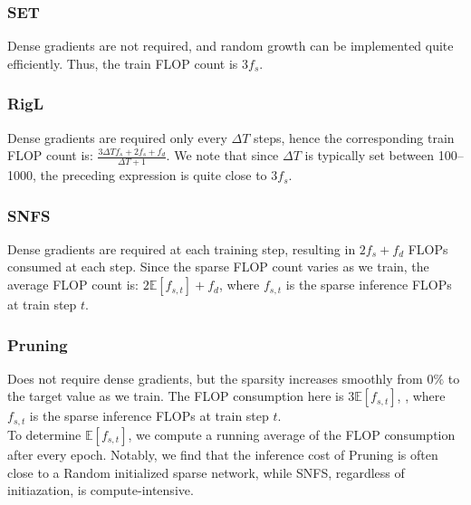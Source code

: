 \subsubsection{SET} Dense gradients are not required, and random growth can be implemented quite efficiently. Thus, the train FLOP count is $3f_s$.

\subsubsection{RigL} Dense gradients are required only every $\Delta T$ steps, hence the corresponding train FLOP count is: $\frac{3\Delta Tf_s + 2f_s + f_d }{\Delta T + 1}$. We note that since $\Delta T$ is typically set between 100--1000, the preceding expression is quite close to $3f_s$.

\subsubsection{SNFS} Dense gradients are required at each training step, resulting in $2f_s + f_d$ FLOPs consumed at each step. Since the sparse FLOP count varies as we train, the average FLOP count is: $2\mathbb{E}[f_{s,t}] + f_d$, where $f_{s,t}$ is the sparse inference FLOPs at train step $t$.

\subsubsection{Pruning} Does not require dense gradients, but the sparsity increases smoothly from $0\%$ to the target value as we train. The FLOP consumption here is $3\mathbb{E}[f_{s,t}]$, , where $f_{s,t}$ is the sparse inference FLOPs at train step $t$.\\

To determine $\mathbb{E}[f_{s,t}]$, we compute a running average of the FLOP consumption after every epoch. Notably, we find that the inference cost of Pruning is often close to a Random initialized sparse network, while SNFS, regardless of initiazation, is compute-intensive.